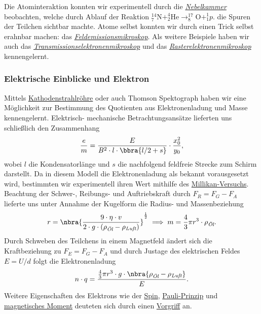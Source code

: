 \documentclass{subfiles}
\begin{document}
    Die Atominteraktion konnten wir experimentell durch die \hyperref[Ub:Nebelkammer]{\emph{Nebelkammer}} beobachten, welche durch Ablauf der Reaktion $_7^{14}\text{N}+_2^4\text{He}\longrightarrow _8^{17}\text{O}+_1^1p.$ die Spuren der Teilchen sichtbar machte. Atome selbst konnten wir durch einen Trick selbst erahnbar machen: das \hyperref[Ub:Feldemissionsmikroskop]{\emph{Feldemissionsmikroskop}}. Als weitere Beispiele haben wir auch das \hyperref[Ub:Transmissionselektronenmikroskop]{\emph{Transmissionselektronenmikroskop}} und das \hyperref[Ub:Rasterelektronenmikroskop]{\emph{Rasterelektronenmikroskop}} kennengelernt. 

    \subsubsection*{Elektrische Einblicke und Elektron}\label{Ub:AtomEigenschaften.ii}
        Mittels \hyperref[Ub:Kathodenstrahl]{Kathodenstrahlröhre} oder auch Thomson Spektograph haben wir eine Möglichkeit zur Bestimmung des Quotienten aus Elektronenladung und Masse kennengelernt. Elektrisch- mechanische Betrachtungsansätze lieferten uns schließlich den Zusammenhang
        \[
            \frac{e}{m} = \frac{E}{B^2\cdot l\cdot \bbra{l/2 + s}}\cdot\frac{x_0^2}{y_0},
        \]
        wobei $l$ die Kondensatorlänge und $s$ die nachfolgend feldfreie Strecke zum Schirm darstellt. Da in diesem Modell die Elektronenladung als bekannt vorausgesetzt wird, bestimmten wir experimentell ihren Wert mithilfe des \hyperref[Ub:Millikan]{Millikan-Versuchs}. Beachtung der Schwer-, Reibungs- und Auftriebskraft durch $F_R = F_G - F_A$ lieferte uns unter Annahme der Kugelform die Radius- und Massenbeziehung
        \[
            r = \nbra{\frac{9\cdot\eta\cdot v}{2\cdot g\cdot (\rho_\textit{Öl} - \rho_\textit{Luft})}}^{\frac{1}{2}}\implies m=\frac{4}{3}\pi r^3\cdot \rho_\textit{Öl}.
        \]
        Durch Schweben des Teilchens in einem Magnetfeld ändert sich die Kraftbeziehung zu $F_E = F_G - F_A$ und durch Justage des elektrischen Feldes $E = U/d$ folgt die Elektronenladung
        \[
            n\cdot q = \frac{\frac{4}{3}\pi r^3\cdot g\cdot \nbra{\rho_\textit{Öl} - \rho_\textit{Luft}}}{E}.
        \]
        Weitere Eigenschaften des Elektrons wie der \hyperref[sec:Spin]{Spin}, \hyperref[subsec:PauliPrinzip]{Pauli-Prinzip} und \hyperref[sec:WWmeFeldern]{magnetisches Moment} deuteten sich durch einen \hyperref[Ub:WeitEigElektron]{Vorgriff} an.
\end{document}
